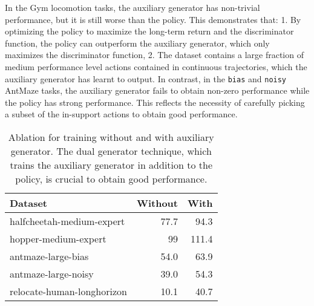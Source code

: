 In the Gym locomotion tasks, the auxiliary generator has non-trivial performance, but it is still worse than the policy. This demonstrates that: 1. By optimizing the policy to maximize the long-term return and the discriminator function, the policy can outperform the auxiliary generator, which only maximizes the discriminator function, 2. The dataset contains a large fraction of medium performance level actions contained in continuous trajectories, which the auxiliary generator has learnt to output. In contrast, in the \texttt{bias} and \texttt{noisy} AntMaze tasks, the auxiliary generator fails to obtain non-zero performance while the policy has strong performance. This reflects the necessity of carefully picking a subset of the in-support actions to obtain good performance.


\begin{table}[!htp]\centering
\caption{Ablation for training without and with auxiliary generator. The dual generator technique, which trains the auxiliary generator in addition to the policy, is crucial to obtain good performance.}\label{tab:abs_aux_gen}
\small
\begin{tabular}{l||rr}
Dataset & Without & With \\ \hline

halfcheetah-medium-expert & 77.7 &  94.3\\
hopper-medium-expert & 99 & 111.4 \\ 

antmaze-large-bias & 54.0 & 63.9 \\

antmaze-large-noisy & 39.0 & 54.3 \\


relocate-human-longhorizon & 10.1 & 40.7 \\ 

\hline
\end{tabular}
\end{table}


